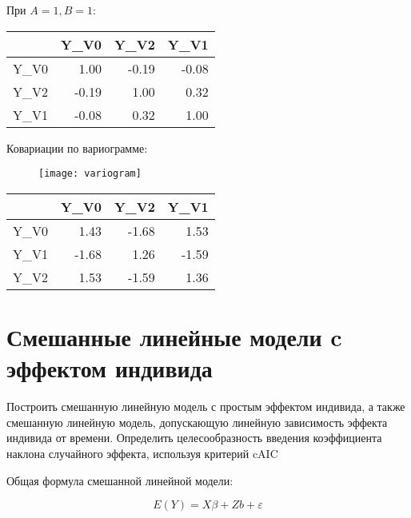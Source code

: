 \documentclass[a4paper,12pt]{article}
\newcommand{\myPictWidth}{.95\textwidth}
\begin{document}
При $ A = 1, B = 1 $:

\begin{table}[H]
	\centering
	\begin{tabular}{rrrr}
        \hline
        & Y\_V0 & Y\_V2 & Y\_V1 \\
        \hline
        Y\_V0 & 1.00 & -0.19 & -0.08 \\
        Y\_V2 & -0.19 & 1.00 & 0.32 \\
        Y\_V1 & -0.08 & 0.32 & 1.00 \\
        \hline
    \end{tabular}
\end{table}

Ковариации по вариограмме:

\begin{figure}[H]
	\centering \texttt{[image: variogram]}
\end{figure}

\begin{table}[H]
    \centering
    \begin{tabular}{rrrr}
        \hline
        & Y\_V0 & Y\_V2 & Y\_V1 \\
        \hline
        Y\_V0 & 1.43 & -1.68 & 1.53 \\
         Y\_V1 & -1.68 & 1.26 & -1.59 \\
        Y\_V2 & 1.53 & -1.59 & 1.36 \\
        \hline
    \end{tabular}
\end{table}


\section{ Смешанные линейные модели c эффектом индивида }

\begin{leftbar}
Построить смешанную линейную модель с простым эффектом индивида, а также смешанную линейную модель, допускающую линейную зависимость эффекта индивида от времени.
Определить целесообразность введения коэффициента наклона случайного эффекта, используя критерий cAIC
\end{leftbar}

Общая формула смешанной линейной модели:

\[ E(Y) = X \beta + Z b + \varepsilon  \]
\end{document}
